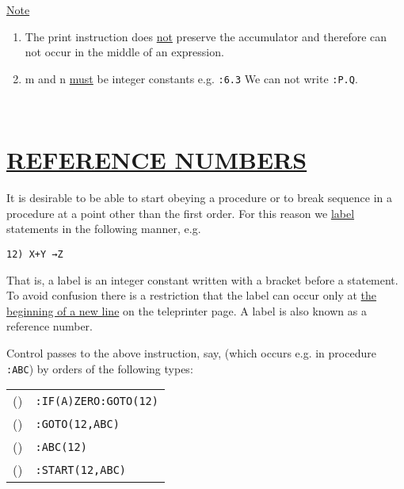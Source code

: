 \documentclass[10pt, a4paper, oneside]{article}
\newcommand{\myuline}[1]{\uline{#1}}
\newcommand{\mytt}[1]{\texttt{\scriptsize #1}}
\newcommand{\mytt}[1]{\texttt{\small #1}}
\newcounter{RowCounter}
\newcommand{\nextRow}{\addtocounter{RowCounter}{1}(\roman{RowCounter})}
\begin{document}
\begin{multicols}{2}
\begin{flushleft}
\myuline{Note}
\end{flushleft}

\renewcommand{\labelenumi}{(\roman{enumi})}
\begin{enumerate}
\def\theenumi{\roman{enumi}}

\item The print instruction does \myuline{not} preserve the
accumulator and therefore can not occur in the middle
of an expression.

\item m and n \myuline{must} be integer constants e.g. \mytt{:6.3}
We can not write \mytt{:P.Q}.
\end{enumerate}

\
\section{\myuline{REFERENCE NUMBERS}}

It is desirable to be able to start obeying a
procedure or to break sequence in a procedure at a
point other than the first order.  For this reason we
\myuline{label} statements in the following manner, e.g.

\begin{addmargin}[1cm]{1em}%
\begin{lstlisting}
12) X+Y →Z
\end{lstlisting}
\end{addmargin}

That is, a label is an integer constant written with
a bracket before a statement. To avoid confusion there
is a restriction that the label can occur only at \myuline{the
beginning of a new line} on the teleprinter page.  A
label is also known as a reference number.

Control passes to the above instruction, say,
(which occurs e.g. in procedure \mytt{:ABC}) by orders of the
following types:

\setcounter{RowCounter}{0}
\begin{tabular}{rl}
\nextRow & \mytt{:IF(A)ZERO:GOTO(12)} \\
\nextRow & \mytt{:GOTO(12,ABC)} \\
\nextRow & \mytt{:ABC(12)} \\
\nextRow & \mytt{:START(12,ABC)} \\
\end{tabular}

\renewcommand{\labelenumi}{(\roman{enumi})}\begin{enumerate}
\def\theenumi{\roman{enumi}}


\end{enumerate}
\end{multicols}
\end{document}
